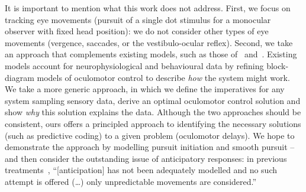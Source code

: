 \documentclass[a4paper]{article} %
\begin{document}
It is important to mention what this work does not address. First, we
focus on tracking eye movements (pursuit of a single dot stimulus for a
monocular observer with fixed head position): we do not consider other
types of eye movements (vergence, saccades, or the vestibulo-ocular
reflex). Second, we take an approach that complements existing models,
such as those of~\citep{Robinson86} and~\citep{Krauzlis89}. Existing 
models account for neurophysiological and behavioural
data by refining block-diagram models of oculomotor control to describe
\emph{how} the system might work. We take a more generic approach, in
which we define the imperatives for any system sampling sensory data,
derive an optimal oculomotor control solution and show \emph{why} this
solution explains the data. Although the two approaches should be
consistent, ours offers a principled approach to identifying the
necessary solutions (such as predictive coding) to a given problem
(oculomotor delays). We hope to demonstrate the approach by modelling
pursuit initiation and smooth pursuit -- and then consider the
outstanding issue of anticipatory responses: in previous treatments~\citep{Robinson86}, 
``{[}anticipation{]} has not been adequately modelled and no such attempt 
is offered (\ldots) only unpredictable movements are considered.''
\end{document}
